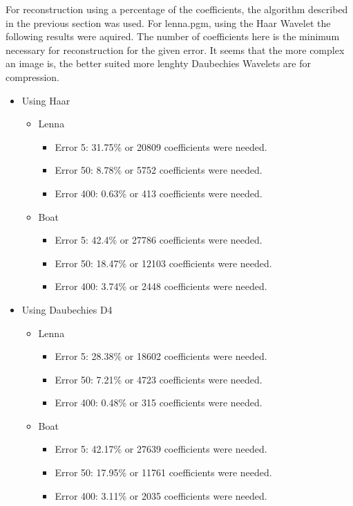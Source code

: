 For reconstruction using a percentage of the coefficients, the algorithm described in the previous section was used.  For lenna.pgm, using the Haar Wavelet the following results were aquired.  The number of coefficients here is the minimum necessary for reconstruction for the given error.  It seems that the more complex an image is, the better suited more lenghty Daubechies Wavelets are for compression. 


\begin{itemize}
\item Using Haar
\begin{itemize}
\item Lenna
\begin{itemize}
\item Error 5: 31.75\% or 20809 coefficients were needed.
\item Error 50: 8.78\% or 5752 coefficients were needed.
\item Error 400: 0.63\% or 413 coefficients were needed.
\end{itemize}

\item Boat
\begin{itemize}
\item Error 5: 42.4\% or 27786 coefficients were needed.
\item Error 50: 18.47\% or 12103 coefficients were needed.
\item Error 400: 3.74\% or 2448 coefficients were needed.
\end{itemize}
\end{itemize}
\item Using Daubechies D4
\begin{itemize}
\item Lenna
\begin{itemize}
\item Error 5: 28.38\% or 18602 coefficients were needed.
\item Error 50: 7.21\% or 4723 coefficients were needed.
\item Error 400: 0.48\% or 315 coefficients were needed.
\end{itemize}

\item Boat
\begin{itemize}
\item Error 5: 42.17\% or 27639 coefficients were needed.
\item Error 50: 17.95\% or 11761 coefficients were needed.
\item Error 400: 3.11\% or 2035 coefficients were needed.
\end{itemize}
\end{itemize}
\end{itemize}

